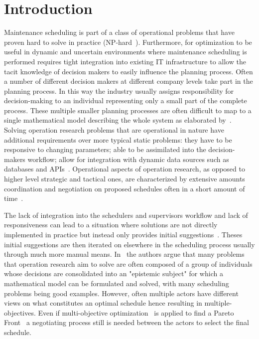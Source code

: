 \section{Introduction}
Maintenance scheduling is part of a class of operational problems that have proven hard to solve in practice (NP-hard~\citep{garey1979computers}).
Furthermore, for optimization to be useful in dynamic and uncertain environments where maintenance scheduling 
is performed requires tight integration into existing IT infrastructure to allow the tacit knowledge of decision makers to easily influence
the planning process. Often a number of different decision makers at different company levels take part in the
planning process. In this way the industry usually assigns responsibility for decision-making to an individual
representing only a small part of the complete process. These multiple smaller planning processes are often difficult
to map to a single mathematical model describing the whole system as elaborated by~\citep{barthelemy2002human}. Solving
operation research problems that are operational in nature have additional requirements over more typical static
problems: they have to be responsive to changing parameters; able to be assimilated into the decision-makers workflow;
allow for integration with dynamic data sources such as databases and APIs~\citep{meignan_review_2015}. Operational
aspects of operation research, as opposed to higher level strategic and tactical ones, are characterized by extensive
amounts coordination and negotiation on proposed schedules often in a short amount of time~\citep{palmerMaintenancePlanningScheduling2019}.

The lack of integration into the schedulers and supervisors workflow and lack of responsiveness can lead to a situation 
where solutions are not directly implemented in practice but instead only provides initial suggestions~\citep{meignan_review_2015}.
Theses initial suggestions are then iterated on elsewhere in the scheduling process usually through much more manual means. 
In~\citep{barthelemy2002human} the authors argue that many problems that operation research aim to solve are often composed
of a group of individuals whose decisions are consolidated into an "epistemic subject" for which a mathematical model can be formulated
and solved, with many scheduling problems being good examples. However, often multiple actors have different
views on what constitutes an optimal schedule hence resulting in multiple-objectives. Even if multi-objective
optimization~\citep{ehrgott2002multiple} is applied to find a Pareto Front~\citep{Pareto1897} a negotiating process
still is needed between the actors to select the final schedule. 

